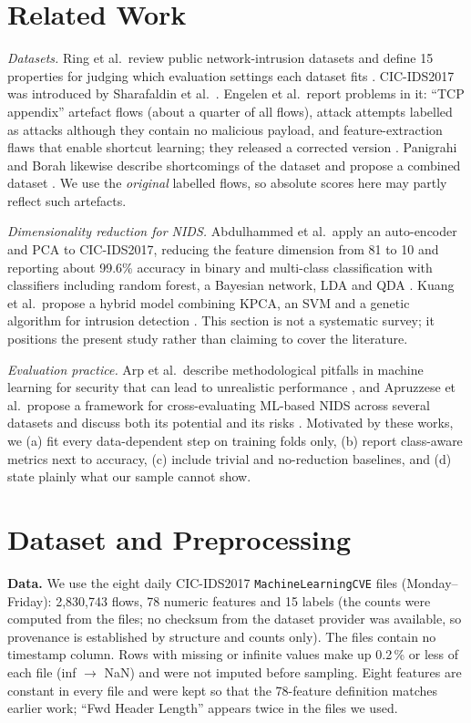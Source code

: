 \documentclass[conference,a4paper]{IEEEtran}
\begin{document}
\section{Related Work}
\textit{Datasets.} Ring et al.\ review public network-intrusion datasets and define 15 properties for judging which evaluation settings each dataset fits \cite{ring2019}. CIC-IDS2017 was introduced by Sharafaldin et al.\ \cite{sharafaldin2018}. Engelen et al.\ report problems in it: ``TCP appendix'' artefact flows (about a quarter of all flows), attack attempts labelled as attacks although they contain no malicious payload, and feature-extraction flaws that enable shortcut learning; they released a corrected version \cite{engelen2021}. Panigrahi and Borah likewise describe shortcomings of the dataset and propose a combined dataset \cite{panigrahi2018}. We use the \emph{original} labelled flows, so absolute scores here may partly reflect such artefacts.

\textit{Dimensionality reduction for NIDS.} Abdulhammed et al.\ apply an auto-encoder and PCA to CIC-IDS2017, reducing the feature dimension from 81 to 10 and reporting about 99.6\% accuracy in binary and multi-class classification with classifiers including random forest, a Bayesian network, LDA and QDA \cite{abdulhammed2019}. Kuang et al.\ propose a hybrid model combining KPCA, an SVM and a genetic algorithm for intrusion detection \cite{kuang2014}. This section is not a systematic survey; it positions the present study rather than claiming to cover the literature.

\textit{Evaluation practice.} Arp et al.\ describe methodological pitfalls in machine learning for security that can lead to unrealistic performance \cite{arp2022}, and Apruzzese et al.\ propose a framework for cross-evaluating ML-based NIDS across several datasets and discuss both its potential and its risks \cite{apruzzese2022}. Motivated by these works, we (a) fit every data-dependent step on training folds only, (b) report class-aware metrics next to accuracy, (c) include trivial and no-reduction baselines, and (d) state plainly what our sample cannot show.

\section{Dataset and Preprocessing}\label{sec:data}
\textbf{Data.} We use the eight daily CIC-IDS2017 \texttt{MachineLearningCVE} files (Monday--Friday): 2{,}830{,}743 flows, 78 numeric features and 15 labels (the counts were computed from the files; no checksum from the dataset provider was available, so provenance is established by structure and counts only). The files contain no timestamp column. Rows with missing or infinite values make up 0.2\,\% or less of each file (inf $\to$ NaN) and were not imputed before sampling. Eight features are constant in every file and were kept so that the 78-feature definition matches earlier work; ``Fwd Header Length'' appears twice in the files we used.
\end{document}

